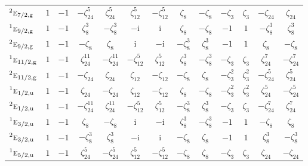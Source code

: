 \documentclass[10pt,a4paper]{article}
\numberwithin{equation}{section}
\newcommand{\irr}[1]{\text{\normalfont\scshape #1}}
\newcommand{\conjpair}[1]{{}^{#1}}
\newcommand{\ptag}[1]{\mathrm{#1}}
\newcommand{\iunit}{\mathrm{i}}
\newcommand{\rootunity}[1]{\zeta_{#1}}
\begin{document}
{\begin{longtable}{@{}lcccccccccccc@{}}
$\conjpair{2}\irr{e}_{7/2,\ptag{g}}$ & $1$ & $-1$ & $-\rootunity{24}^{5}$ & $\rootunity{24}^{5}$ & $\rootunity{12}^{5}$ & $-\rootunity{12}^{5}$ & $\rootunity{8}$ & $-\rootunity{8}$ & $-\rootunity{3}$ & $\rootunity{3}$ & $-\rootunity{24}$ & $\rootunity{24}$\\
$\conjpair{1}\irr{e}_{9/2,\ptag{g}}$ & $1$ & $-1$ & $\rootunity{8}^{3}$ & $-\rootunity{8}^{3}$ & $-\iunit{}$ & $\iunit{}$ & $\rootunity{8}$ & $-\rootunity{8}$ & $-1$ & $1$ & $-\rootunity{8}^{3}$ & $\rootunity{8}^{3}$\\
$\conjpair{2}\irr{e}_{9/2,\ptag{g}}$ & $1$ & $-1$ & $-\rootunity{8}$ & $\rootunity{8}$ & $\iunit{}$ & $-\iunit{}$ & $-\rootunity{8}^{3}$ & $\rootunity{8}^{3}$ & $-1$ & $1$ & $\rootunity{8}$ & $-\rootunity{8}$\\
$\conjpair{1}\irr{e}_{11/2,\ptag{g}}$ & $1$ & $-1$ & $\rootunity{24}^{11}$ & $-\rootunity{24}^{11}$ & $-\rootunity{12}^{5}$ & $\rootunity{12}^{5}$ & $\rootunity{8}^{3}$ & $-\rootunity{8}^{3}$ & $-\rootunity{3}$ & $\rootunity{3}$ & $\rootunity{24}^{7}$ & $-\rootunity{24}^{7}$\\
$\conjpair{2}\irr{e}_{11/2,\ptag{g}}$ & $1$ & $-1$ & $-\rootunity{24}$ & $\rootunity{24}$ & $\rootunity{12}$ & $-\rootunity{12}$ & $-\rootunity{8}$ & $\rootunity{8}$ & $-\rootunity{3}^{2}$ & $\rootunity{3}^{2}$ & $-\rootunity{24}^{5}$ & $\rootunity{24}^{5}$\\
$\conjpair{1}\irr{e}_{1/2,\ptag{u}}$ & $1$ & $-1$ & $\rootunity{24}$ & $-\rootunity{24}$ & $\rootunity{12}$ & $-\rootunity{12}$ & $\rootunity{8}$ & $-\rootunity{8}$ & $-\rootunity{3}^{2}$ & $\rootunity{3}^{2}$ & $\rootunity{24}^{5}$ & $-\rootunity{24}^{5}$\\
$\conjpair{2}\irr{e}_{1/2,\ptag{u}}$ & $1$ & $-1$ & $-\rootunity{24}^{11}$ & $\rootunity{24}^{11}$ & $-\rootunity{12}^{5}$ & $\rootunity{12}^{5}$ & $-\rootunity{8}^{3}$ & $\rootunity{8}^{3}$ & $-\rootunity{3}$ & $\rootunity{3}$ & $-\rootunity{24}^{7}$ & $\rootunity{24}^{7}$\\
$\conjpair{1}\irr{e}_{3/2,\ptag{u}}$ & $1$ & $-1$ & $\rootunity{8}$ & $-\rootunity{8}$ & $\iunit{}$ & $-\iunit{}$ & $\rootunity{8}^{3}$ & $-\rootunity{8}^{3}$ & $-1$ & $1$ & $-\rootunity{8}$ & $\rootunity{8}$\\
$\conjpair{2}\irr{e}_{3/2,\ptag{u}}$ & $1$ & $-1$ & $-\rootunity{8}^{3}$ & $\rootunity{8}^{3}$ & $-\iunit{}$ & $\iunit{}$ & $-\rootunity{8}$ & $\rootunity{8}$ & $-1$ & $1$ & $\rootunity{8}^{3}$ & $-\rootunity{8}^{3}$\\
$\conjpair{1}\irr{e}_{5/2,\ptag{u}}$ & $1$ & $-1$ & $\rootunity{24}^{5}$ & $-\rootunity{24}^{5}$ & $\rootunity{12}^{5}$ & $-\rootunity{12}^{5}$ & $-\rootunity{8}$ & $\rootunity{8}$ & $-\rootunity{3}$ & $\rootunity{3}$ & $\rootunity{24}$ & $-\rootunity{24}$\\

\end{longtable}}
\end{document}
